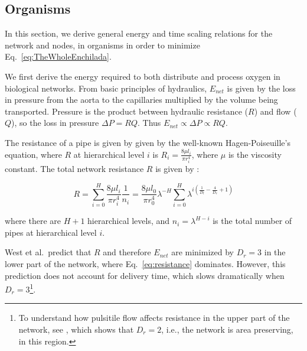 \documentclass[12pt]{article}
\begin{document}


\subsection{Organisms}
\label{sec:organisms}

In this section, we derive general energy and time scaling relations for the
network and nodes, in organisms in order to minimize Eq.~\ref{eq:TheWholeEnchilada}.  

We first derive the energy required to both distribute and process oxygen in
biological networks. From basic principles of hydraulics, 
$E_{net}$ is
given by the loss in pressure from the aorta to the capillaries multiplied by
the volume being transported.  Pressure is the product between hydraulic
resistance ($R$) and flow ($Q$), so the loss in pressure $\Delta P = RQ$.  Thus
$E_{net} \propto \Delta P \propto RQ$.

The resistance of a pipe is given by given by the well-known Hagen-Poiseuille's
equation, where $R$ at hierarchical level $i$ is $R_i = \frac{8\mu l_i}{\pi
r_i^4}$, where $\mu$ is the viscosity constant.  The total network resistance
$R$ is given by \cite{west97}:

\begin{equation}
\label{eq:resistance}
R = \sum_{i=0}^H \frac{8\mu l_i}{\pi r_i^4}\frac{1}{n_i}
= \frac{8\mu l_0}{\pi r_0^4} \lambda^{-H}\sum_{i=0}^H \lambda^{i 
\left(\frac{1}{D_l} - \frac{4}{D_r} + 1 \right)}
\end{equation}

\noindent where there are $H+1$ hierarchical levels, and $n_i = \lambda^{H-i}$
is the total number of pipes at hierarchical level $i$.  

West et al.\ predict that $R$ and therefore $E_{net}$ are minimized by $D_r =
3$ in the lower part of the network,  where Eq.~\ref{eq:resistance} dominates.
However, this prediction does not account for delivery time, which slows
dramatically when $D_r = 3$\footnote{To understand how pulsitile flow affects
resistance in the upper part of the network, see \cite{west97}, which shows
that $D_r = 2$, i.e., the network is area preserving, in this region.}.
\end{document}
